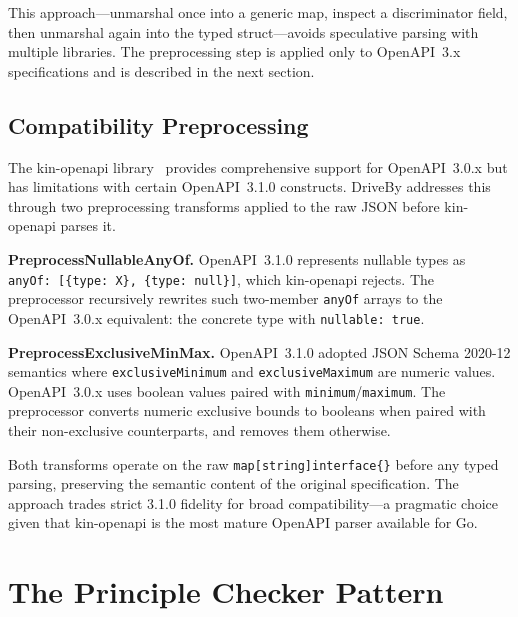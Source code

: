 This approach---unmarshal once into a generic map, inspect a discriminator field, then unmarshal again into the typed struct---avoids speculative parsing with multiple libraries. The preprocessing step is applied only to OpenAPI~3.x specifications and is described in the next section.

\subsection{Compatibility Preprocessing}
\label{subsec:preprocessing}

The kin-openapi library~\cite{kin-openapi} provides comprehensive support for OpenAPI~3.0.x but has limitations with certain OpenAPI~3.1.0 constructs. DriveBy addresses this through two preprocessing transforms applied to the raw JSON before kin-openapi parses it.

\textbf{PreprocessNullableAnyOf.} OpenAPI~3.1.0 represents nullable types as \texttt{anyOf: [\{type: X\}, \{type: null\}]}, which kin-openapi rejects. The preprocessor recursively rewrites such two-member \texttt{anyOf} arrays to the OpenAPI~3.0.x equivalent: the concrete type with \texttt{nullable: true}.

\textbf{PreprocessExclusiveMinMax.} OpenAPI~3.1.0 adopted JSON Schema 2020-12 semantics where \texttt{exclusiveMinimum} and \texttt{exclusiveMaximum} are numeric values. OpenAPI~3.0.x uses boolean values paired with \texttt{minimum}/\texttt{maximum}. The preprocessor converts numeric exclusive bounds to booleans when paired with their non-exclusive counterparts, and removes them otherwise.

Both transforms operate on the raw \texttt{map[string]interface\{\}} before any typed parsing, preserving the semantic content of the original specification. The approach trades strict 3.1.0 fidelity for broad compatibility---a pragmatic choice given that kin-openapi is the most mature OpenAPI parser available for Go.

\section{The Principle Checker Pattern}
\label{sec:principle-checker}
\label{sec:principle-checker-pattern}

